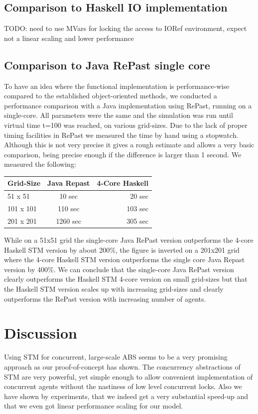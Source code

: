 \subsection{Comparison to Haskell IO implementation}
TODO: need to use MVars for locking the access to IORef environment, expect not a linear scaling and lower performance

\subsection{Comparison to Java RePast single core}
To have an idea where the functional implementation is performance-wise compared to the established object-oriented methods, we conducted a performance comparison with a Java implementation using RePast, running on a single-core. All parameters were the same and the simulation was run until virtual time t=100 was reached, on various grid-sizes. Due to the lack of proper timing facilities in RePast we measured the time by hand using a stopwatch. Although this is not very precise it gives a rough estimate and allows a very basic comparison, being precise enough if the difference is larger than 1 second. We measured the following:

\begin{center}
  \begin{tabular}{ l || c | r }
    Grid-Size & Java Repast & 4-Core Haskell \\ \hline \hline 
    51 x 51 & 10 sec & 20 sec \\ \hline
    101 x 101 & 110 sec & 103 sec \\ \hline
    201 x 201 & 1260 sec & 305 sec \\ \hline
  \end{tabular}
\end{center}

While on a 51x51 grid the single-core Java RePast version outperforms the 4-core Haskell STM version by about 200\%, the figure is inverted on a 201x201 grid where the 4-core Haskell STM version outperforms the single core Java Repast version by 400\%. We can conclude that the single-core Java RePast version clearly outperforms the Haskell STM 4-core version on small grid-sizes but that the Haskell STM version scales up with increasing grid-sizes and clearly outperforms the RePast version with increasing number of agents.

\section{Discussion}
\label{sect:stm_discussion}
Using STM for concurrent, large-scale ABS seems to be a very promising approach as our proof-of-concept has shown. The concurrency abstractions of STM are very powerful, yet simple enough to allow convenient implementation of concurrent agents without the nastiness of low level concurrent locks. Also we have shown by experiments, that we indeed get a very substantial speed-up and that we even got linear performance scaling for our model. 

